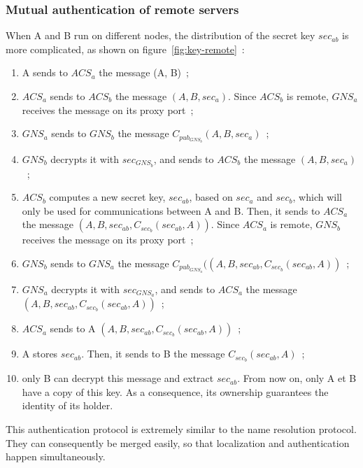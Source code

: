 \subsubsection{Mutual authentication of remote servers}

When A and B run on different nodes, the distribution of the secret key 
 \(sec_{ab}\) is more complicated, as shown on figure~\ref{fig:key-remote}~:


\begin{enumerate}
\item A sends to \(ACS_{a}\) the message (A, B)~;
\item \(ACS_{a}\) sends to \(ACS_{b}\) the message \((A,B, sec_{a})\). Since \(ACS_{b}\) is remote, \(GNS_{a}\) receives the message on its proxy port~; 
\item \(GNS_{a}\) sends to \(GNS_{b}\) the message \(C_{pub_{GNS_{b}}}(A, B, sec_{a})\)~;
\item \(GNS_{b}\) decrypts it with \(sec_{GNS_{b}}\), and sends to \(ACS_{b}\) the message \((A, B, sec_{a})\)~;
\item \(ACS_{b}\) computes a new secret key, \(sec_{ab}\), based on
\(sec_{a}\) and \(sec_{b}\), which will only be used for communications
between A and B. Then, it sends to \(ACS_{a}\) the message  \((A, B, sec_{ab}, C_{sec_{b}}(sec_{ab}, A))\). Since \(ACS_{a}\) is remote, \(GNS_{b}\) receives the message on its proxy port~;
\item \(GNS_{b}\) sends to \(GNS_{a}\) the message \(C_{pub_{GNS_{a}}}((A, B, sec_{ab}, C_{sec_{b}}(sec_{ab}, A))\)~;
\item \(GNS_{a}\) decrypts it with \(sec_{GNS_{a}}\), and sends to \(ACS_{a}\) the message \((A, B, sec_{ab}, C_{sec_{b}}(sec_{ab}, A))\)~;
\item \(ACS_{a}\) sends to A \((A, B, sec_{ab}, C_{sec_{b}}(sec_{ab}, A))\)~;
\item A  stores \(sec_{ab}\). Then, it sends to B the message \(C_{sec_{b}}(sec_{ab}, A)\)~;
\item only B can decrypt this message and extract \(sec_{ab}\). From now on,
only A et B have a copy of this key. As a consequence, its ownership
guarantees the identity of its holder.
\end{enumerate}

This authentication protocol is extremely similar to the name resolution
protocol. They can consequently be merged easily, so that localization and
authentication happen simultaneously.

